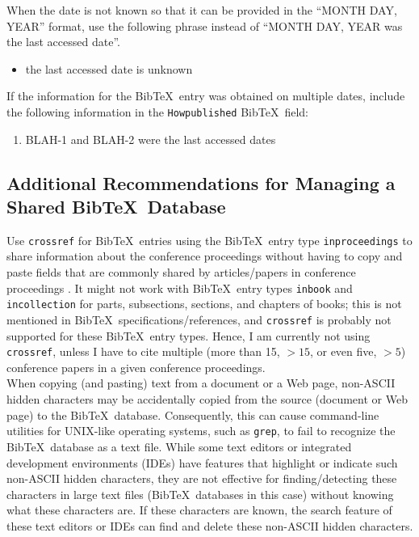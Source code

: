 \documentclass[letter,12pt]{article}
\begin{document}
When the date is not known so that it can be provided in the ``MONTH DAY, YEAR'' format, use the following phrase instead of ``MONTH DAY, YEAR was the last accessed date''. \vspace{-0.3cm}
\begin{itemize} \itemsep -4pt
\item the last accessed date is unknown
\end{itemize}


If the information for the {\sc Bib}\TeX\ entry was obtained on multiple dates, include the following information in the {\tt Howpublished} {\sc Bib}\TeX\ field: \vspace{-0.3cm}
\begin{enumerate} \itemsep -4pt
\item BLAH-1 and BLAH-2 were the last accessed dates
\end{enumerate}








\subsection{Additional Recommendations for Managing a Shared {\sc Bib}\TeX\ Database}
\label{ssec:AdditionalRecommendationsForManagingASharedBibTeXDatabase}



Use {\tt crossref} for {\sc Bib}\TeX\ entries using the {\sc Bib}\TeX\ entry type {\tt inproceedings} to share information about the conference proceedings without having to copy and paste fields that are commonly shared by articles/papers in conference proceedings \cite[\S12.2.3, pp. 234]{Kopka2004}. It might not work with {\sc Bib}\TeX\ entry types {\tt inbook} and {\tt incollection} for parts, subsections, sections, and chapters of books; this is not mentioned in {\sc Bib}\TeX\ specifications/references, and {\tt crossref} is probably not supported for these {\sc Bib}\TeX\ entry types. Hence, I am currently not using {\tt crossref}, unless I have to cite multiple (more than 15, $>15$, or even five, $>5$) conference papers in a given conference proceedings. \\



When copying (and pasting) text from a document or a Web page, non-ASCII hidden characters may be accidentally copied from the source (document or Web page) to the {\sc Bib}\TeX\ database. Consequently, this can cause command-line utilities for UNIX-like operating systems, such as {\tt grep}, to fail to recognize the {\sc Bib}\TeX\ database as a text file. While some text editors or integrated development environments (IDEs) have features that highlight or indicate such non-ASCII hidden characters, they are not effective for finding/detecting these characters in large text files ({\sc Bib}\TeX\ databases in this case) without knowing what these characters are. If these characters are known, the search feature of these text editors or IDEs can find and delete these non-ASCII hidden characters. \\
\end{document}
